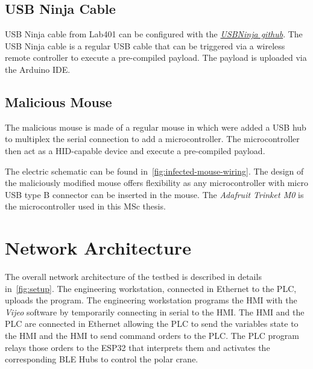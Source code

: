 \subsection{USB Ninja Cable}

USB Ninja cable from Lab401 can be configured with the  \href{https://github.com/4d4c/USBNinja}{\emph{USBNinja github}}. The USB Ninja cable is a regular USB cable that can be triggered via a wireless remote controller to execute a pre-compiled payload. The payload is uploaded via the Arduino IDE. 

\subsection{Malicious Mouse}

The malicious mouse is made of a regular mouse in which were added a USB hub to multiplex the serial connection to add a microcontroller. The microcontroller then act as a HID-capable device and execute a pre-compiled payload.

The electric schematic can be found in~\autoref{fig:infected-mouse-wiring}. The design of the maliciously modified mouse offers flexibility as any microcontroller with micro USB type B connector can be inserted in the mouse. The \emph{Adafruit Trinket M0} is the microcontroller used in this MSc thesis.  

\section{Network Architecture}

The overall network architecture of the testbed is described in details in~\autoref{fig:setup}. The engineering workstation, connected in Ethernet to the PLC, uploads the program. The engineering workstation programs the HMI with the \emph{Vijeo} software by temporarily connecting in serial to the HMI. The HMI and the PLC are connected in Ethernet allowing the PLC to send the variables state to the HMI and the HMI to send command orders to the PLC. The PLC program relays those orders to the ESP32 that interprets them and activates the corresponding BLE Hubs to control the polar crane. 

